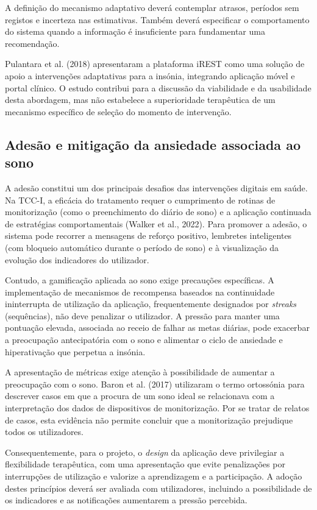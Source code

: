 A definição do mecanismo adaptativo deverá contemplar atrasos, períodos sem registos e incerteza nas estimativas. Também deverá especificar o comportamento do sistema quando a informação é insuficiente para fundamentar uma recomendação.

Pulantara et al. (2018) apresentaram a plataforma iREST como uma solução de apoio a intervenções adaptativas para a insónia, integrando aplicação móvel e portal clínico. O estudo contribui para a discussão da viabilidade e da usabilidade desta abordagem, mas não estabelece a superioridade terapêutica de um mecanismo específico de seleção do momento de intervenção.

\subsection{Adesão e mitigação da ansiedade associada ao sono}
\label{sec:chap2_adesaoDigital}

A adesão constitui um dos principais desafios das intervenções digitais em saúde. Na TCC-I, a eficácia do tratamento requer o cumprimento de rotinas de monitorização (como o preenchimento do diário de sono) e a aplicação continuada de estratégias comportamentais (Walker et al., 2022). Para promover a adesão, o sistema pode recorrer a mensagens de reforço positivo, lembretes inteligentes (com bloqueio automático durante o período de sono) e à visualização da evolução dos indicadores do utilizador.   

Contudo, a gamificação aplicada ao sono exige precauções específicas. A implementação de mecanismos de recompensa baseados na continuidade ininterrupta de utilização da aplicação, frequentemente designados por \textit{streaks} (sequências), não deve penalizar o utilizador. A pressão para manter uma pontuação elevada, associada ao receio de falhar as metas diárias, pode exacerbar a preocupação antecipatória com o sono e alimentar o ciclo de ansiedade e hiperativação que perpetua a insónia. 

A apresentação de métricas exige atenção à possibilidade de aumentar a preocupação com o sono. Baron et al. (2017) utilizaram o termo ortossónia para descrever casos em que a procura de um sono ideal se relacionava com a interpretação dos dados de dispositivos de monitorização. Por se tratar de relatos de casos, esta evidência não permite concluir que a monitorização prejudique todos os utilizadores.

Consequentemente, para o projeto, o \textit{design} da aplicação deve privilegiar a flexibilidade terapêutica, com uma apresentação que evite penalizações por interrupções de utilização e valorize a aprendizagem e a participação. A adoção destes princípios deverá ser avaliada com utilizadores, incluindo a possibilidade de os indicadores e as notificações aumentarem a pressão percebida.


